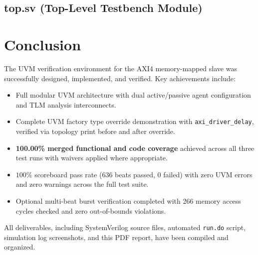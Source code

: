 \documentclass[10pt,a4paper]{article}
\begin{document}
\subsection{top.sv (Top-Level Testbench Module)}


\section{Conclusion}
The UVM verification environment for the AXI4 memory-mapped slave was successfully designed, implemented, and verified.
Key achievements include:
\begin{itemize}
    \item Full modular UVM architecture with dual active/passive agent configuration and TLM analysis interconnects.
    \item Complete UVM factory type override demonstration with \texttt{axi\_driver\_delay}, verified via topology print before and after override.
    \item \textbf{100.00\% merged functional and code coverage} achieved across all three test runs with waivers applied where appropriate.
    \item $100\%$ scoreboard pass rate ($636$ beats passed, $0$ failed) with zero UVM errors and zero warnings across the full test suite.
    \item Optional multi-beat burst verification completed with 266 memory access cycles checked and zero out-of-bounds violations.
\end{itemize}
All deliverables, including SystemVerilog source files, automated \texttt{run.do} script, simulation log screenshots, and this PDF report, have been compiled and organized.
\end{document}
